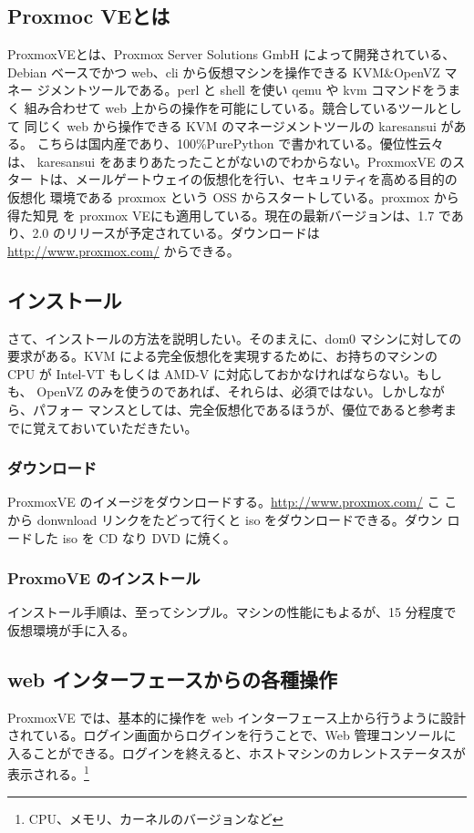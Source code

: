 \documentclass[mingoth,a4paper]{jsarticle}
\begin{document}
\subsection{Proxmoc VEとは}
ProxmoxVEとは、Proxmox Server Solutions GmbH によって開発されている、
Debian ベースでかつ web、cli から仮想マシンを操作できる KVM\&OpenVZ マネー
ジメントツールである。perl と shell を使い qemu や kvm コマンドをうまく
組み合わせて web 上からの操作を可能にしている。競合しているツールとして
同じく web から操作できる KVM のマネージメントツールの karesansui がある。
こちらは国内産であり、100\%PurePython で書かれている。優位性云々は、
karesansui をあまりあたったことがないのでわからない。ProxmoxVE のスター
トは、メールゲートウェイの仮想化を行い、セキュリティを高める目的の仮想化
環境である proxmox という OSS からスタートしている。proxmox から得た知見
を proxmox VEにも適用している。現在の最新バージョンは、1.7 であり、2.0
のリリースが予定されている。ダウンロードは \url{http://www.proxmox.com/}
からできる。

\subsection{インストール}
さて、インストールの方法を説明したい。そのまえに、dom0 マシンに対しての
要求がある。KVM による完全仮想化を実現するために、お持ちのマシンの CPU
が Intel-VT もしくは AMD-V に対応しておかなければならない。もしも、
OpenVZ のみを使うのであれば、それらは、必須ではない。しかしながら、パフォー
マンスとしては、完全仮想化であるほうが、優位であると参考までに覚えておいていただきたい。

\subsubsection{ダウンロード}
ProxmoxVE のイメージをダウンロードする。\url{http://www.proxmox.com/} こ
こから donwnload リンクをたどって行くと iso をダウンロードできる。ダウン
ロードした iso を CD なり DVD に焼く。

\subsubsection{ProxmoVE のインストール}
インストール手順は、至ってシンプル。マシンの性能にもよるが、15 分程度で仮想環境が手に入る。

\subsection{web インターフェースからの各種操作}
ProxmoxVE では、基本的に操作を web インターフェース上から行うように設計
されている。ログイン画面からログインを行うことで、Web 管理コンソールに入ることができる。ログインを終えると、ホストマシンのカレントステータスが表示される。\footnote{CPU、メモリ、カーネルのバージョンなど}
\end{document}
